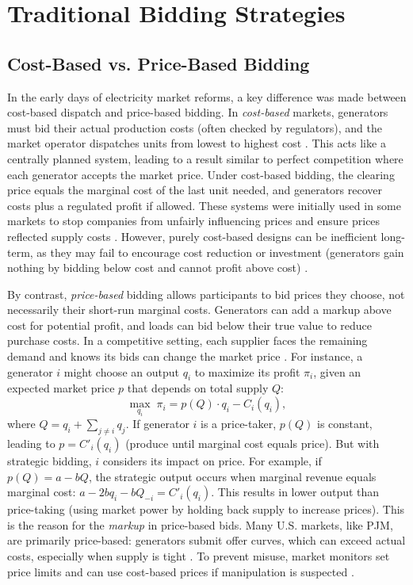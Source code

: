 \documentclass[conference]{IEEEtran}
\begin{document}
\section{Traditional Bidding Strategies}

\subsection{Cost-Based vs. Price-Based Bidding}

In the early days of electricity market reforms, a key difference was made between cost-based dispatch and price-based bidding. In \textit{cost-based} markets, generators must bid their actual production costs (often checked by regulators), and the market operator dispatches units from lowest to highest cost \cite{Schweppe1988}. This acts like a centrally planned system, leading to a result similar to perfect competition where each generator accepts the market price. Under cost-based bidding, the clearing price equals the marginal cost of the last unit needed, and generators recover costs plus a regulated profit if allowed. These systems were initially used in some markets to stop companies from unfairly influencing prices and ensure prices reflected supply costs \cite{Hogan1992, Joskow1997}. However, purely cost-based designs can be inefficient long-term, as they may fail to encourage cost reduction or investment (generators gain nothing by bidding below cost and cannot profit above cost) \cite{JoskowSchmalensee1983}.

By contrast, \textit{price-based} bidding allows participants to bid prices they choose, not necessarily their short-run marginal costs. Generators can add a markup above cost for potential profit, and loads can bid below their true value to reduce purchase costs. In a competitive setting, each supplier faces the remaining demand and knows its bids can change the market price \cite{Borenstein1999}. For instance, a generator $i$ might choose an output $q_i$ to maximize its profit $\pi_i$, given an expected market price $p$ that depends on total supply $Q$:
\begin{equation}\label{eq:profit}
    \max_{q_i} \; \pi_i = p(Q) \cdot q_i - C_i(q_i),
\end{equation}
where $Q = q_i + \sum_{j\neq i} q_j$. If generator $i$ is a price-taker, $p(Q)$ is constant, leading to $p = C'_i(q_i)$ (produce until marginal cost equals price). But with strategic bidding, $i$ considers its impact on price. For example, if $p(Q) = a - bQ$, the strategic output occurs when marginal revenue equals marginal cost: $a - 2bq_i - bQ_{-i} = C'_i(q_i)$. This results in lower output than price-taking (using market power by holding back supply to increase prices). This is the reason for the \textit{markup} in price-based bids. Many U.S. markets, like PJM, are primarily price-based: generators submit offer curves, which can exceed actual costs, especially when supply is tight \cite{PJM_MMU_Report_Specific}. To prevent misuse, market monitors set price limits and can use cost-based prices if manipulation is suspected \cite{Wolak2000}.
\end{document}
